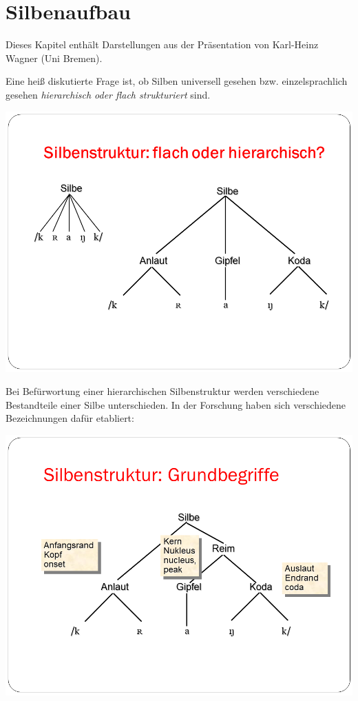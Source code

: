 \documentclass[
  letterpaper,
]{scrbook}
\begin{document}
\hypertarget{silbenaufbau}{%
\section{Silbenaufbau}\label{silbenaufbau}}

Dieses Kapitel enthält Darstellungen aus der Präsentation von Karl-Heinz
Wagner (Uni Bremen).

Eine heiß diskutierte Frage ist, ob Silben universell gesehen bzw.
einzelsprachlich gesehen \emph{hierarchisch oder flach strukturiert}
sind.

\includegraphics[width=1\textwidth,height=\textheight]{./pictures/Wagner_Maas_Duden_Petric_14.PNG}

Bei Befürwortung einer hierarchischen Silbenstruktur werden verschiedene
Bestandteile einer Silbe unterschieden. In der Forschung haben sich
verschiedene Bezeichnungen dafür etabliert:

\includegraphics[width=1\textwidth,height=\textheight]{./pictures/Wagner_Maas_Duden_Petric_15.PNG}
\end{document}
